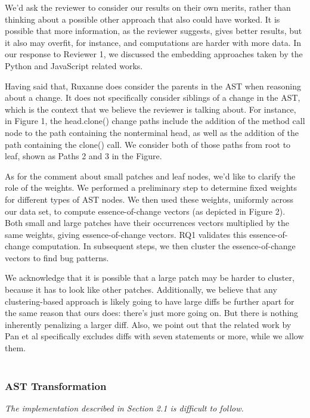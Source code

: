 \documentclass{article}
\begin{document}
We'd ask the reviewer to consider our results on their own merits, rather than thinking about a possible other approach that also could have worked. It is possible that more information, as the reviewer suggests, gives better results, but it also may overfit, for instance, and computations are harder with more data. In our response to Reviewer 1, we discussed the embedding approaches taken by the Python and JavaScript related works.

Having said that, Ruxanne does consider the parents in the AST when reasoning about a change. It does not specifically consider siblings of a change in the AST, which is the context that we believe the reviewer is talking about. For instance, in Figure 1, the head.clone() change paths include the addition of the method call node to the path containing the nonterminal head, as well as the addition of the path containing the clone() call. We consider both of those paths from root to leaf, shown as Paths 2 and 3 in the Figure.

As for the comment about small patches and leaf nodes, we'd like to clarify the role of the weights. We performed a preliminary step to determine fixed weights for different types of AST nodes. We then used these weights, uniformly across our data set, to compute essence-of-change vectors (as depicted in Figure 2). Both small and large patches have their occurrences vectors multiplied by the same weights, giving essence-of-change vectors. RQ1 validates this essence-of-change computation. In subsequent steps, we then cluster the essence-of-change vectors to find bug patterns. 

We acknowledge that it is possible that a large patch may be harder to cluster, because it has to look like other patches.  Additionally, we believe that any clustering-based approach is likely going to have large diffs be further apart for the same reason that ours does: there's just more going on. But there is nothing inherently penalizing a larger diff. Also, we point out that the related work by Pan et al specifically excludes diffs with seven statements or more, while we allow them. \\ \\

\subsubsection{AST Transformation}

\textit{The implementation described in Section 2.1 is difficult to follow.}
\end{document}
